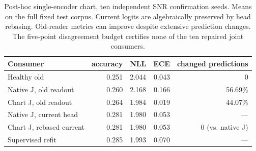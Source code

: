 \begin{table}[t]
\centering
\caption{Post-hoc single-encoder chart, ten independent SNR confirmation seeds. Means on the full fixed test corpus. Current logits are algebraically preserved by head rebasing. Old-reader metrics can improve despite extensive prediction changes. The five-point disagreement budget certifies none of the ten repaired joint consumers.}
\label{tab:chart_confirmation}
\footnotesize
\begin{tabular}{lrrrr}
\toprule
Consumer & accuracy & NLL & ECE & changed predictions \\
\midrule
Healthy old & 0.251 & 2.044 & 0.043 & 0 \\
Native J, old readout & 0.260 & 2.168 & 0.166 & 56.69\% \\
Chart J, old readout & 0.264 & 1.984 & 0.019 & 44.07\% \\
Native J, current head & 0.281 & 1.980 & 0.053 & --- \\
Chart J, rebased current & 0.281 & 1.980 & 0.053 & 0 (vs. native J) \\
Supervised refit & 0.285 & 1.993 & 0.070 & --- \\
\bottomrule
\end{tabular}
\end{table}
